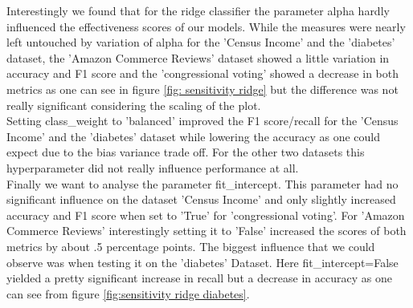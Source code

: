\documentclass[a4paper,10pt]{article}
\begin{document}
Interestingly we found that for the ridge classifier the parameter \textsf{alpha} hardly influenced the effectiveness scores of our models. While the measures were nearly left untouched by variation of \textsf{alpha} for the 'Census Income' and the 'diabetes' dataset, the 'Amazon Commerce Reviews' dataset showed a little variation  in accuracy and F1 score and the 'congressional voting' showed a decrease in both metrics as one can see in figure \ref{fig: sensitivity ridge} but the difference was not really significant considering the scaling of the plot.\\
Setting \textsf{class\_weight} to 'balanced' improved the F1 score/recall for the 'Census Income' and the 'diabetes' dataset while lowering the accuracy as one could expect due to the bias variance trade off. For the other two datasets this hyperparameter did not really influence performance at all.\\
Finally we want to analyse the parameter \textsf{fit\_intercept}. This parameter had no significant influence on the dataset 'Census Income' and only slightly increased accuracy and F1 score when set to 'True' for 'congressional voting'. For 'Amazon Commerce Reviews' interestingly setting it to 'False' increased the scores of both metrics by about .5 percentage points. The biggest influence that we could observe was when testing it on the 'diabetes' Dataset. Here \textsf{fit\_intercept}=False yielded a pretty significant increase in recall but a decrease in accuracy as one can see from figure \ref{fig:sensitivity ridge diabetes}.
\end{document}
